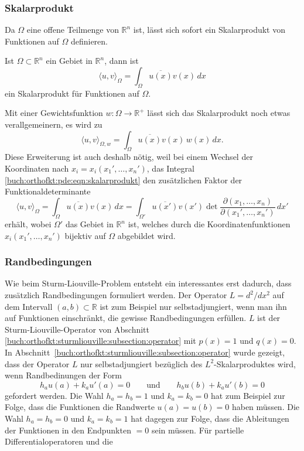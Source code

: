 %
%
\subsubsection{Skalarprodukt}
Da $\Omega$ eine offene Teilmenge von $\mathbb{R}^n$ ist, lässt sich
sofort ein Skalarprodukt von Funktionen auf $\Omega$ definieren.

\begin{definition}
Ist $\Omega\subset \mathbb{R}^n$ ein Gebiet in $\mathbb{R}^n$, dann ist
\begin{equation}
\langle u,v\rangle_\Omega
=
\int_{\Omega}  \overline{u(x)} v(x)\,dx
\label{buch:orthofkt:pde:eqn:skalarprodukt}
\end{equation}
ein Skalarprodukt für Funktionen auf $\Omega$.
\end{definition}

Mit einer Gewichtsfunktion $w\colon \Omega \to \mathbb{R}^+$ lässt sich
das Skalarprodukt noch etwas verallgemeinern, es wird zu
\[
\langle u,v\rangle_{\Omega,w}
=
\int_{\Omega} \overline{u(x)}v(x)\,w(x)\,dx.
\]
Diese Erweiterung ist auch deshalb nötig, weil bei einem Wechsel
der Koordinaten nach $x_i=x_i(x_1',\dots,x_n')$, das Integral
\eqref{buch:orthofkt:pde:eqn:skalarprodukt}
den zusätzlichen Faktor der Funktionaldeterminante 
\[
\langle u,v\rangle_{\Omega}
=
\int_{\Omega} \overline{u(x)} v(x)\,dx 
=
\int_{\Omega'} \overline{u(x')} v(x')
\det\frac{\partial(x_1,\dots,x_n)}{\partial(x_1',\dots,x_n')}
\,dx'
\]
erhält, wobei $\Omega'$ das Gebiet in $\mathbb{R}^n$ ist, welches
durch die Koordinatenfunktionen $x_i(x_1',\dots,x_n')$ bijektiv auf
$\Omega$ abgebildet wird.


%
%
\subsubsection{Randbedingungen}
Wie beim Sturm-Liouville-Problem entsteht ein interessantes 
erst dadurch, dass zusätzlich Randbedingungen formuliert werden.
Der Operator $L=d^2/dx^2$ auf dem Intervall $(a,b)\subset\mathbb{R}$
ist zum Beispiel nur selbstadjungiert, wenn man ihn auf Funktionen
einschränkt, die gewisse Randbedingungen erfüllen.
$L$ ist der Sturm-Liouville-Operator von Abschnitt
\ref{buch:orthofkt:sturmliouville:subsection:operator}
mit $p(x)=1$ und $q(x)=0$.
In Abschnitt~\ref{buch:orthofkt:sturmliouville:subsection:operator}
wurde gezeigt, dass der Operator $L$ nur selbstadjungiert bezüglich
des $L^2$-Skalarproduktes wird, wenn Randbedinungen der Form
\begin{equation}
h_a u(a) + k_a u'(a) =  0
\qquad\text{und}\qquad
h_b u(b) + k_a u'(b) =  0
\end{equation}
gefordert werden.
Die Wahl $h_a=h_b=1$ und $k_a=k_b=0$ hat zum Beispiel zur Folge,
dass die Funktionen die Randwerte $u(a)=u(b)=0$ haben müssen.
Die Wahl $h_a=h_b=0$ und $k_a=k_b=1$ hat dagegen zur Folge,
dass die Ableitungen der Funktionen in den Endpunkten $=0$ sein
müssen.
Für partielle Differentialoperatoren und die 

